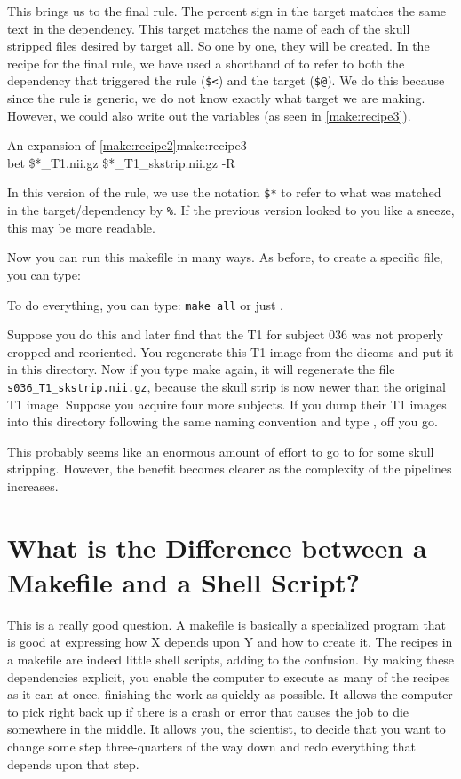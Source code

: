 This brings us to the final rule. The percent sign in the target matches the same text in the dependency. This target matches the name of each of the skull stripped files desired by target all. So one by one, they will be created. In the recipe for the final rule, we have used a shorthand of \maken{} to refer to both the dependency that triggered the rule (\texttt{\$<}) and the target (\texttt{\$@}). We do this because since the rule is generic, we do not know exactly what target we are making. However, we could also write out the variables (as seen in \autoref{make:recipe3}).
	
\begin{make}{An expansion of \autoref{make:recipe2}}{make:recipe3}
	 \\
	\tab bet \$*_T1.nii.gz \$*_T1_skstrip.nii.gz -R
\end{make}
	
In this version of the rule, we use the notation \texttt{\$*} to refer to what was matched in the target/dependency by \texttt{\%}. If the previous version looked to you like a sneeze, this may be more readable.
	
Now you can run this makefile in many ways. As before, to create a specific file, you can type:	
	
To do everything, you can type: \texttt{make all} or just \maken{}.
	
Suppose you do this and later find that the T1 for subject 036 was not properly cropped and reoriented. You regenerate this T1 image from the dicoms and put it in this directory. Now if you type make again, it will regenerate the file \texttt{s036_T1_skstrip.nii.gz}, because the skull strip is now newer than the original T1 image. Suppose you acquire four more subjects. If you dump their T1 images into this directory following the same naming convention and type \maken{}, off you go.

This probably seems like an enormous amount of effort to go to for some skull stripping. However, the benefit becomes clearer as the complexity of the pipelines increases.
	
\section{What is the Difference between a Makefile and a Shell Script?}
	
This is a really good question. A makefile is basically a specialized program that is good at expressing how X depends upon Y and how to create it. The recipes in a makefile are indeed little shell scripts, adding to the confusion. By making these dependencies explicit, you enable the computer to execute as many of the recipes as it can at once, finishing the work as quickly as possible. It allows the computer to pick right back up if there is a crash or error that causes the job to die somewhere in the middle. It allows you, the scientist, to decide that you want to change some step three-quarters of the way down and redo everything that depends upon that step.
	
